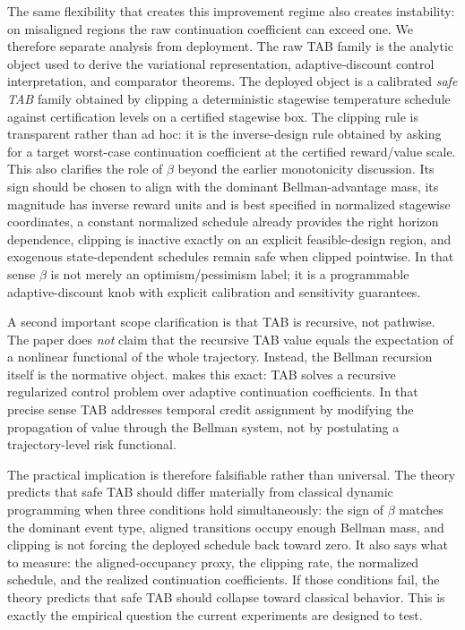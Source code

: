 \documentclass{article}
\theoremstyle{remark}
\begin{document}
The same flexibility that creates this improvement regime also creates instability: on misaligned regions the raw continuation coefficient can exceed one. We therefore separate analysis from deployment. The raw TAB family is the analytic object used to derive the variational representation, adaptive-discount control interpretation, and comparator theorems. The deployed object is a calibrated \emph{safe TAB} family obtained by clipping a deterministic stagewise temperature schedule against certification levels on a certified stagewise box. The clipping rule is transparent rather than ad hoc: it is the inverse-design rule obtained by asking for a target worst-case continuation coefficient at the certified reward/value scale. This also clarifies the role of $\beta$ beyond the earlier monotonicity discussion. Its sign should be chosen to align with the dominant Bellman-advantage mass, its magnitude has inverse reward units and is best specified in normalized stagewise coordinates, a constant normalized schedule already provides the right horizon dependence, clipping is inactive exactly on an explicit feasible-design region, and exogenous state-dependent schedules remain safe when clipped pointwise. In that sense $\beta$ is not merely an optimism/pessimism label; it is a programmable adaptive-discount knob with explicit calibration and sensitivity guarantees.

A second important scope clarification is that TAB is recursive, not pathwise. The paper does \emph{not} claim that the recursive TAB value equals the expectation of a nonlinear functional of the whole trajectory. Instead, the Bellman recursion itself is the normative object.  makes this exact: TAB solves a recursive regularized control problem over adaptive continuation coefficients. In that precise sense TAB addresses temporal credit assignment by modifying the propagation of value through the Bellman system, not by postulating a trajectory-level risk functional.

The practical implication is therefore falsifiable rather than universal. The theory predicts that safe TAB should differ materially from classical dynamic programming when three conditions hold simultaneously: the sign of $\beta$ matches the dominant event type, aligned transitions occupy enough Bellman mass, and clipping is not forcing the deployed schedule back toward zero. It also says what to measure: the aligned-occupancy proxy, the clipping rate, the normalized schedule, and the realized continuation coefficients. If those conditions fail, the theory predicts that safe TAB should collapse toward classical behavior. This is exactly the empirical question the current experiments are designed to test.
\end{document}
